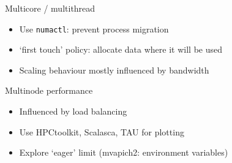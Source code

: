 \begin{numberedframe}{Multicore / multithread}
  \begin{itemize}
  \item Use \texttt{numactl}: prevent process migration
  \item `first touch' policy: allocate data where it will be used
  \item Scaling behaviour mostly influenced by bandwidth
  \end{itemize}
\end{numberedframe}

\begin{numberedframe}{Multinode performance}
  \begin{itemize}
  \item Influenced by load balancing
  \item Use HPCtoolkit, Scalasca, TAU for plotting
  \item Explore `eager' limit (mvapich2: environment variables)
  \end{itemize}
\end{numberedframe}

\endinput

\begin{numberedframe}{}
  \begin{itemize}
  \item 
  \end{itemize}
\end{numberedframe}

\begin{numberedframe}{}
  \begin{itemize}
  \item 
  \end{itemize}
\end{numberedframe}

